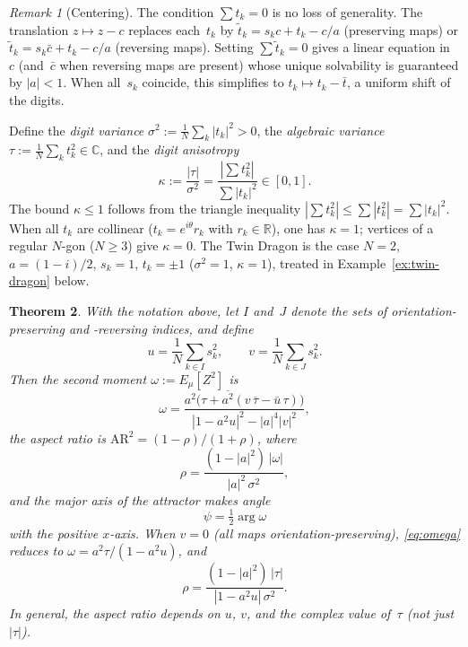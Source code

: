 \documentclass{amsart}
\newtheorem{theorem}{Theorem}
\theoremstyle{definition}
\theoremstyle{remark}
\newtheorem{remark}[theorem]{Remark}
\begin{document}
\begin{remark}[Centering]\label{rem:centering}
The condition $\sum t_k = 0$ is no loss of generality.
The translation $z \mapsto z - c$ replaces each~$t_k$ by
$\tilde{t}_k = s_k c + t_k - c/a$ (preserving maps) or
$\tilde{t}_k = s_k \bar{c} + t_k - c/a$ (reversing maps).
Setting $\sum \tilde{t}_k = 0$ gives a linear equation in~$c$
(and~$\bar{c}$ when reversing maps are present)
whose unique solvability is guaranteed by $|a| < 1$.
When all~$s_k$ coincide, this simplifies to
$t_k \mapsto t_k - \bar{t}$, a uniform shift of the digits.
\end{remark}

Define the \emph{digit variance} $\sigma^2 := \tfrac{1}{N}\sum_k |t_k|^2 > 0$,
the \emph{algebraic variance} $\tau := \tfrac{1}{N}\sum_k t_k^2 \in \mathbb{C}$,
and the \emph{digit anisotropy}
\[
  \kappa := \frac{|\tau|}{\sigma^2}
         = \frac{|\sum t_k^2|}{\sum |t_k|^2} \in [0,1].
\]
The bound $\kappa \leq 1$ follows from the triangle inequality
$|\sum t_k^2| \leq \sum |t_k^2| = \sum |t_k|^2$.
When all $t_k$ are collinear ($t_k = e^{i\theta}r_k$ with $r_k \in \mathbb{R}$),
one has $\kappa = 1$; vertices of a regular $N$-gon ($N\geq 3$) give $\kappa = 0$.
The Twin Dragon is the case $N=2$, $a = (1-i)/2$, $s_k = 1$, $t_k = \pm 1$
($\sigma^2=1$, $\kappa=1$), treated in Example~\ref{ex:twin-dragon} below.

\begin{theorem}\label{thm:family}
With the notation above, let $I$ and~$J$ denote the sets of
orientation-preserving and -reversing indices, and define
\[
  u = \frac{1}{N}\!\sum_{k \in I}s_k^2,\qquad
  v = \frac{1}{N}\!\sum_{k \in J}s_k^2.
\]
Then the second moment $\omega := E_\mu[Z^2]$ is
\begin{equation}\label{eq:omega}
  \omega
  = \frac{a^2\bigl(\tau + \overline{a^2}(v\,\overline{\tau}
          - \bar{u}\,\tau)\bigr)}
         {|1-a^2 u|^2 - |a|^4|v|^2},
\end{equation}
the aspect ratio is
$\mathrm{AR}^2 = (1-\rho)/(1+\rho)$, where
\begin{equation}\label{eq:rho}
  \rho = \frac{(1-|a|^2)\,|\omega|}{|a|^2\,\sigma^2},
\end{equation}
and the major axis of the attractor makes angle
\begin{equation}\label{eq:psi}
  \psi = \tfrac{1}{2}\arg\omega
\end{equation}
with the positive $x$-axis.
When $v = 0$ \textup{(}all maps orientation-preserving\textup{)},
\eqref{eq:omega} reduces to
$\omega = a^2\tau/(1-a^2 u)$, and
\begin{equation}\label{eq:rho-pres}
  \rho = \frac{(1-|a|^2)\,|\tau|}{|1-a^2 u|\,\sigma^2}.
\end{equation}
In general, the aspect ratio depends on $u$, $v$, and the
complex value of~$\tau$ \textup{(}not just~$|\tau|$\textup{)}.
\end{theorem}
\end{document}
